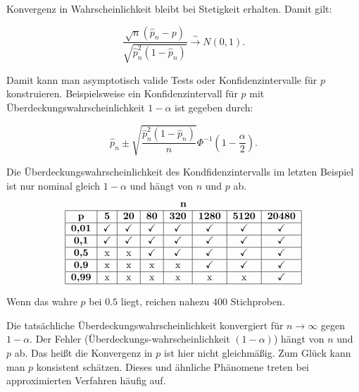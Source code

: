 \documentclass[10pt]{article}
\newcommand{\KV}{\overset{\sim} \longrightarrow} %
\newenvironment{BSP}[1][]
{\begin{Beispiel}[frametitle=#1]}{\end{Beispiel}}
\begin{document}
\begin{BSP}[Beispiel 1.3.6 (Delta-Methode)]
		\noindent Konvergenz in Wahrscheinlichkeit bleibt bei Stetigkeit erhalten. Damit gilt:
		
		\begin{equation*}
			\frac{\sqrt{n}(\hat{p}_n-p)}{\sqrt{\hat{p}_n^2(1-\hat{p}_n)}} \KV N(0,1).
		\end{equation*}
		
		Damit kann man asymptotisch valide Tests oder Konfidenzintervalle für $p$ konstruieren. Beispielsweise ein Konfidenzintervall für $p$ mit Überdeckungswahrscheinlichkeit $1-\alpha$ ist gegeben durch:
		
		\begin{equation*}
			\hat{p}_n \pm \sqrt{\frac{\hat{p}_n^2 (1-\hat{p}_n)}{n}} \Phi^{-1} \left(1-\frac{\alpha}{2}\right).
		\end{equation*}
		
	\end{BSP}
	
	\noindent Die Überdeckungswahrscheinlichkeit des Kondfidenzintervalls im letzten Beispiel ist nur nominal gleich $1-\alpha$ und hängt von $n$ und $p$ ab. 
	\begin{align*}
		\begin{tabular}{|c|c|c|c|c|c|c|c|}
			\multicolumn{8}{c}{$\textbf{n}$}\\
			\hline
			\textbf{p} & \textbf{5} & \textbf{20} & \textbf{80} & \textbf{320} & \textbf{1280} & \textbf{5120} & \textbf{20480}\\
			\hline
			\textbf{0,01} & \checkmark & \checkmark & \checkmark & \checkmark & \checkmark & \checkmark & \checkmark \\
			\hline
			\textbf{0,1} & \checkmark & \checkmark & \checkmark & \checkmark & \checkmark & \checkmark & \checkmark\\
			\hline
			\textbf{0,5} & x & x & \checkmark & \checkmark & \checkmark & \checkmark & \checkmark\\
			\hline
			\textbf{0,9} &x &x &x &x & \checkmark& \checkmark& \checkmark\\
			\hline
			\textbf{0,99} &x &x &x &x &x &x & \checkmark \\
			\hline
		\end{tabular}
	\end{align*}
	
	
	
	\noindent Wenn das wahre $p$ bei $0.5$ liegt, reichen nahezu $400$ Stichproben. 
	
	Die tatsächliche Überdeckungswahrscheinlichkeit konvergiert für  $n \rightarrow \infty$ gegen $1-\alpha$. Der Fehler (Überdeckungs-wahrscheinlichkeit $(1-\alpha)$) hängt von $n$ und $p$ ab. Das heißt die Konvergenz in $p$ ist hier nicht gleichmäßig. Zum Glück kann man $p$ konsistent schätzen. Dieses und ähnliche Phänomene treten bei approximierten Verfahren häufig auf. 
	
\end{document}
